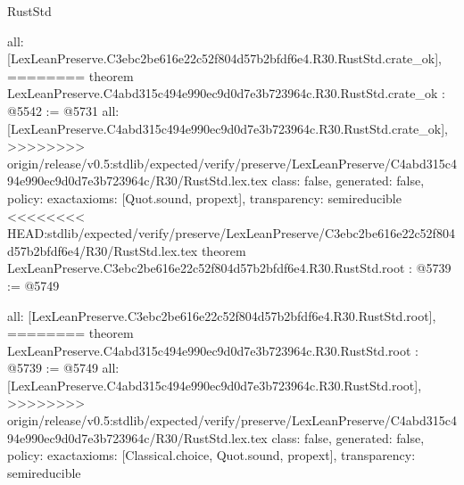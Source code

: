 \begin{lexlean}{RustStd}
\begin{coremodule}
{\begin{coremodule}
{{{{{{{{{{  all: [LexLeanPreserve.C3ebc2be616e22c52f804d57b2bfdf6e4.R30.RustStd.crate_ok],
========
theorem LexLeanPreserve.C4abd315c494e990ec9d0d7e3b723964c.R30.RustStd.crate_ok : @5542 := @5731 {
  all: [LexLeanPreserve.C4abd315c494e990ec9d0d7e3b723964c.R30.RustStd.crate_ok],
>>>>>>>> origin/release/v0.5:stdlib/expected/verify/preserve/LexLeanPreserve/C4abd315c494e990ec9d0d7e3b723964c/R30/RustStd.lex.tex
  class: false,
  generated: false,
  policy: exact{axioms: [Quot.sound, propext]},
  transparency: semireducible
}
<<<<<<<< HEAD:stdlib/expected/verify/preserve/LexLeanPreserve/C3ebc2be616e22c52f804d57b2bfdf6e4/R30/RustStd.lex.tex
theorem LexLeanPreserve.C3ebc2be616e22c52f804d57b2bfdf6e4.R30.RustStd.root : @5739 := @5749 {
  all: [LexLeanPreserve.C3ebc2be616e22c52f804d57b2bfdf6e4.R30.RustStd.root],
========
theorem LexLeanPreserve.C4abd315c494e990ec9d0d7e3b723964c.R30.RustStd.root : @5739 := @5749 {
  all: [LexLeanPreserve.C4abd315c494e990ec9d0d7e3b723964c.R30.RustStd.root],
>>>>>>>> origin/release/v0.5:stdlib/expected/verify/preserve/LexLeanPreserve/C4abd315c494e990ec9d0d7e3b723964c/R30/RustStd.lex.tex
  class: false,
  generated: false,
  policy: exact{axioms: [Classical.choice, Quot.sound, propext]},
  transparency: semireducible
}

}}}}}}}}}}}
\end{coremodule}}
\end{coremodule}
\end{lexlean}
